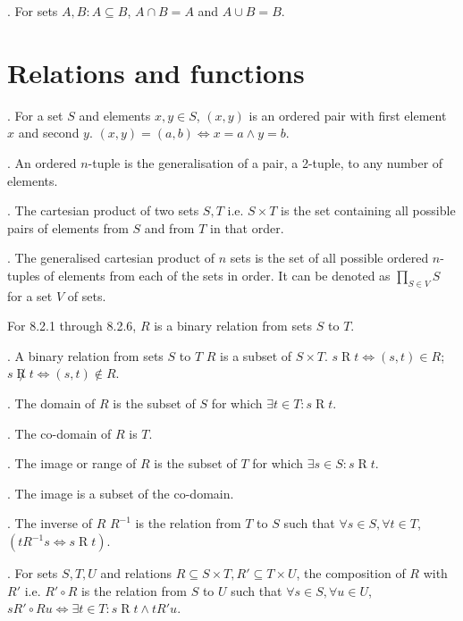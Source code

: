 \documentclass{slnotes}
\begin{document}
. For sets \(A, B : A \subseteq B\), \(A \cap B = A\) and \(A \cup B = B\).

\chapter{Relations and functions}
. For a set \(S\) and elements \(x, y \in S\), \((x, y)\) is an ordered pair with first element \(x\) and second \(y\). \((x, y) = (a, b) \Leftrightarrow x = a \land y = b\).

. An ordered \(n\)-tuple is the generalisation of a pair, a 2-tuple, to any number of elements.

. The cartesian product of two sets \(S, T\) i.e. \(S \times T\) is the set containing all possible pairs of elements from \(S\) and from \(T\) in that order.

. The generalised cartesian product of \(n\) sets is the set of all possible ordered \(n\)-tuples of elements from each of the sets in order. It can be denoted as \(\prod_{S\in V}S\) for a set \(V\) of sets.

For 8.2.1 through 8.2.6, \(R\) is a binary relation from sets \(S\) to \(T\).

. A binary relation from sets \(S\) to \(T\) \(R\) is a subset of \(S \times T\). \(s \mathrel{R} t \Leftrightarrow (s, t) \in R\); \(s \mathrel{\not R} t \Leftrightarrow (s, t) \not\in R\).

. The domain of \(R\) is the subset of \(S\) for which \(\exists t \in T : s \mathrel{R} t\).

. The co-domain of \(R\) is \(T\).

. The image or range of \(R\) is the subset of \(T\) for which \(\exists s \in S : s \mathrel{R} t\).

. The image is a subset of the co-domain.

. The inverse of \(R\) \(R^{-1}\) is the relation from \(T\) to \(S\) such that \(\forall s \in S, \forall t \in T
\), \((t \mathrel{R^{-1}} s \Leftrightarrow s \mathrel{R} t)\).

. For sets \(S, T, U\) and relations \(R \subseteq S \times T, R' \subseteq T \times U\), the composition of \(R\) with \(R'\) i.e. \(R' \circ R\) is the relation from \(S\) to \(U\) such that \(\forall s \in S, \forall u \in U\), \(s \mathrel{R' \circ R} u \Leftrightarrow \exists t \in T : s \mathrel{R} t \land t \mathrel{R'} u\).
\end{document}

